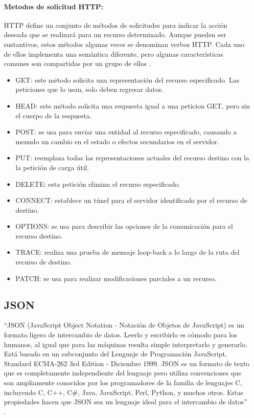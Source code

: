 \paragraph{Metodos de solicitud HTTP:}

HTTP define un conjunto de métodos de solicitudes para indicar la acción deseada que se realizará para un recurso determinado. Aunque pueden ser sustantivos, estos métodos algunas veces se denominan verbos HTTP. Cada uno de ellos implementa una semántica diferente, pero algunas características comunes son compartidas por un grupo de ellos \cite{HTTPM}.\\

\begin{itemize}
	\item GET: este método solicita una representación del recurso especificado. Las peticiones que lo usan, solo deben regresar datos.
	\item HEAD: este método solicita una respuesta igual a una peticion GET, pero sin el cuerpo de la respuesta.
	\item POST: se usa para enviar una entidad al recurso especificado, causando a menudo un cambio en el estado o efectos secundarios en el servidor.
	\item PUT: reemplaza todas las representaciones actuales del recurso destino con la la petición de carga útil.
	\item DELETE: esta petición elimina el recurso especificado.
	\item CONNECT: establece un túnel para el servidor identificado por el recurso de destino.
	\item OPTIONS: se usa para describir las opciones de la comunicación para el recurso destino.
	\item TRACE: realiza una prueba de mensaje loop-back a lo largo de la ruta del recurso de destino. 
	\item PATCH: se usa para realizar modificaciones parciales a un recurso.
\end{itemize}

\subsection{JSON}

``JSON (JavaScript Object Notation - Notación de Objetos de JavaScript) es un formato ligero de intercambio de datos. Leerlo y escribirlo es cómodo para los humanos, al igual que para las máquinas resulta simple interpretarlo y generarlo. Está basado en un subconjunto del Lenguaje de Programación JavaScript, Standard ECMA-262 3rd Edition - Diciembre 1999. JSON es un formato de texto que es completamente independiente del lenguaje pero utiliza convenciones que son ampliamente conocidos por los programadores de la familia de lenguajes C, incluyendo C, C++, C\#, Java, JavaScript, Perl, Python, y muchos otros. Estas propiedades hacen que JSON sea un lenguaje ideal para el intercambio de datos'' \cite{JSON}.\\

